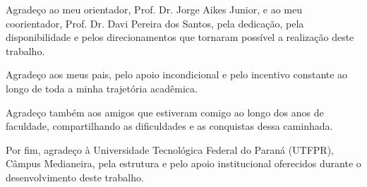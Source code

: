 
\begin{agradecimentos}%

Agradeço ao meu orientador, Prof. Dr. Jorge Aikes Junior, e ao meu coorientador, Prof. Dr. Davi Pereira dos Santos, pela dedicação, pela disponibilidade e pelos direcionamentos que tornaram possível a realização deste trabalho.

Agradeço aos meus pais, pelo apoio incondicional e pelo incentivo constante ao longo de toda a minha trajetória acadêmica.

Agradeço também aos amigos que estiveram comigo ao longo dos anos de faculdade, compartilhando as dificuldades e as conquistas dessa caminhada.

Por fim, agradeço à Universidade Tecnológica Federal do Paraná (UTFPR), Câmpus Medianeira, pela estrutura e pelo apoio institucional oferecidos durante o desenvolvimento deste trabalho.

\end{agradecimentos}
%
